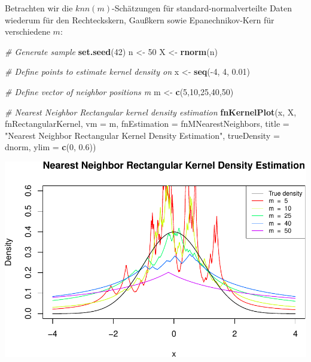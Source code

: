 \documentclass[10pt,]{article}
\newenvironment{Shaded}{\begin{snugshade}}{\end{snugshade}}
\newcommand{\KeywordTok}[1]{\textcolor[rgb]{0.13,0.29,0.53}{\textbf{{#1}}}}
\newcommand{\DataTypeTok}[1]{\textcolor[rgb]{0.13,0.29,0.53}{{#1}}}
\newcommand{\DecValTok}[1]{\textcolor[rgb]{0.00,0.00,0.81}{{#1}}}
\newcommand{\FloatTok}[1]{\textcolor[rgb]{0.00,0.00,0.81}{{#1}}}
\newcommand{\StringTok}[1]{\textcolor[rgb]{0.31,0.60,0.02}{{#1}}}
\newcommand{\CommentTok}[1]{\textcolor[rgb]{0.56,0.35,0.01}{\textit{{#1}}}}
\newcommand{\NormalTok}[1]{{#1}}
\begin{document}
Betrachten wir die \(knn(m)\)-Schätzungen für standard-normalverteilte
Daten wiederum für den Rechteckskern, Gaußkern sowie Epanechnikov-Kern
für verschiedene \(m\):

\begin{Shaded}
\begin{Highlighting}[]
\CommentTok{# Generate sample}
\KeywordTok{set.seed}\NormalTok{(}\DecValTok{42}\NormalTok{)}
\NormalTok{n <-}\StringTok{ }\DecValTok{50}
\NormalTok{X <-}\StringTok{ }\KeywordTok{rnorm}\NormalTok{(n)}

\CommentTok{# Define points to estimate kernel density on}
\NormalTok{x <-}\StringTok{ }\KeywordTok{seq}\NormalTok{(-}\DecValTok{4}\NormalTok{, }\DecValTok{4}\NormalTok{, }\FloatTok{0.01}\NormalTok{)}

\CommentTok{# Define vector of neighbor positions m}
\NormalTok{m <-}\StringTok{ }\KeywordTok{c}\NormalTok{(}\DecValTok{5}\NormalTok{,}\DecValTok{10}\NormalTok{,}\DecValTok{25}\NormalTok{,}\DecValTok{40}\NormalTok{,}\DecValTok{50}\NormalTok{)}

\CommentTok{# Nearest Neighbor Rectangular kernel density estimation}
\KeywordTok{fnKernelPlot}\NormalTok{(x, X, fnRectangularKernel, }\DataTypeTok{vm =} \NormalTok{m,}
             \DataTypeTok{fnEstimation =} \NormalTok{fnMNearestNeighbors,}
             \DataTypeTok{title =} \StringTok{"Nearest Neighbor Rectangular Kernel Density Estimation"}\NormalTok{,}
             \DataTypeTok{trueDensity =} \NormalTok{dnorm, }\DataTypeTok{ylim =} \KeywordTok{c}\NormalTok{(}\DecValTok{0}\NormalTok{, }\FloatTok{0.6}\NormalTok{))}
\end{Highlighting}
\end{Shaded}

\includegraphics{project2_files/figure-latex/m-nearest neighbors test-1.pdf}
\end{document}
